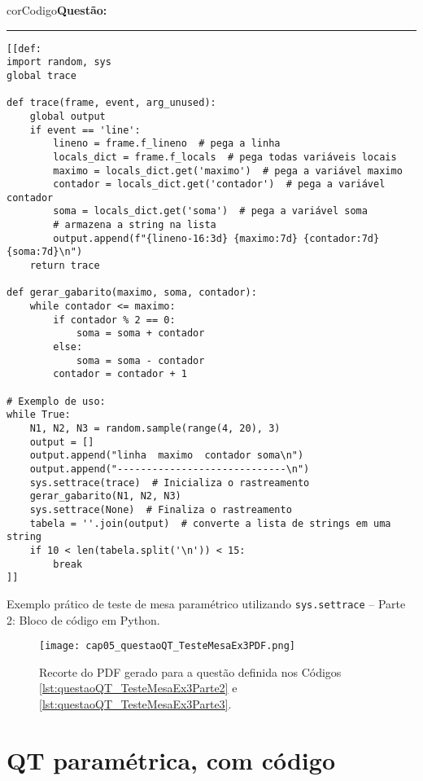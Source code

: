 \begin{listing}[!ht]
\begin{myboxCode}{corCodigo}{\textbf{Questão: }}\vspace{3mm}
\hrule
\begin{verbatim}
[[def:
import random, sys
global trace

def trace(frame, event, arg_unused):
    global output
    if event == 'line':
        lineno = frame.f_lineno  # pega a linha
        locals_dict = frame.f_locals  # pega todas variáveis locais
        maximo = locals_dict.get('maximo')  # pega a variável maximo
        contador = locals_dict.get('contador')  # pega a variável contador
        soma = locals_dict.get('soma')  # pega a variável soma
        # armazena a string na lista
        output.append(f"{lineno-16:3d} {maximo:7d} {contador:7d} {soma:7d}\n")  
    return trace

def gerar_gabarito(maximo, soma, contador):
    while contador <= maximo:
        if contador % 2 == 0:
            soma = soma + contador
        else:
            soma = soma - contador
        contador = contador + 1

# Exemplo de uso:
while True:
    N1, N2, N3 = random.sample(range(4, 20), 3)
    output = []
    output.append("linha  maximo  contador soma\n")
    output.append("-----------------------------\n")
    sys.settrace(trace)  # Inicializa o rastreamento
    gerar_gabarito(N1, N2, N3)
    sys.settrace(None)  # Finaliza o rastreamento
    tabela = ''.join(output)  # converte a lista de strings em uma string
    if 10 < len(tabela.split('\n')) < 15:
        break
]]
\end{verbatim}
\end{myboxCode}
\caption{Exemplo prático de teste de mesa paramétrico utilizando \texttt{sys.settrace} -- Parte 2: Bloco de código em Python.}
\label{lst:questaoQT_TesteMesaEx3Parte3}
\end{listing}

\begin{figure}[b]
  \texttt{[image: cap05\_questaoQT\_TesteMesaEx3PDF.png]}
  \caption{Recorte do PDF gerado para a questão definida nos Códigos \ref{lst:questaoQT_TesteMesaEx3Parte2} e \ref{lst:questaoQT_TesteMesaEx3Parte3}.}
  \label{fig:cap05_questaoQT_TesteMesaEx3PDF}
\end{figure}

\section{QT paramétrica, com código}\label{sec:questoesQT_VPL}

